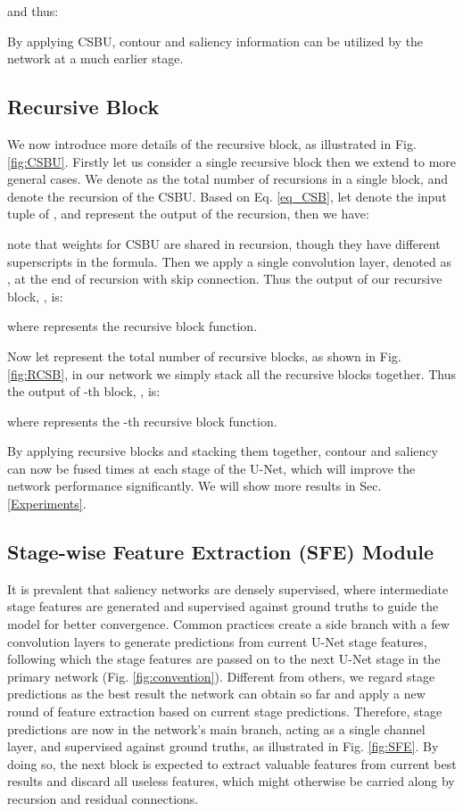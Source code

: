 \documentclass[10pt,twocolumn,letterpaper]{article}
\begin{document}
and thus:


By applying CSBU, contour and saliency information can be utilized by the network at a much earlier stage.

\subsection{Recursive Block}
We now introduce more details of the recursive block, as illustrated in Fig. \ref{fig:CSBU}. Firstly let us consider a single recursive block then we extend to more general cases. We denote  as the total number of recursions in a single block, and  denote the  recursion of the CSBU. Based on Eq. \ref{eq_CSB}, let  denote the input tuple of , and  represent the output of the  recursion, then we have:

note that weights for CSBU are shared in recursion, though they have different superscripts in the formula. Then we apply a single convolution layer, denoted as , at the end of recursion with skip connection. Thus the output of our recursive block, , is:

where  represents the recursive block function.

Now let  represent the total number of recursive blocks,  as shown in Fig. \ref{fig:RCSB}, in our network we simply stack all the recursive blocks together. Thus the output of -th block, , is:

where  represents the -th recursive block function.

By applying recursive blocks and stacking them together, contour and saliency can now be fused  times at each stage of the U-Net, which will improve the network performance significantly. We will show more results in Sec. \ref{Experiments}.

\subsection{Stage-wise Feature Extraction (SFE) Module}

It is prevalent that saliency networks are densely supervised, where intermediate stage features are generated and supervised against ground truths to guide the model for better convergence. Common practices create a side branch with a few convolution layers to generate predictions from current U-Net stage features, following which the stage features are passed on to the next U-Net stage in the primary network (Fig. \ref{fig:convention}). Different from others, we regard stage predictions as the best result the network can obtain so far and apply a new round of feature extraction based on current stage predictions. Therefore, stage predictions are now in the network's main branch, acting as a single channel layer, and supervised against ground truths, as illustrated in Fig. \ref{fig:SFE}. By doing so, the next block is expected to extract valuable features from current best results and discard all useless features, which might otherwise be carried along by recursion and residual connections.
\end{document}

